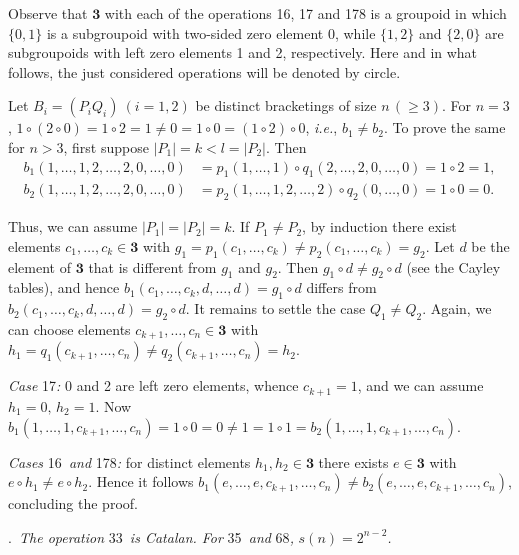 \documentclass[a4paper,reqno]{amsart}\usepackage{amssymb,latexsym}
\theoremstyle{definition}
\theoremstyle{remark}
\numberwithin{equation}{section}
\numberwithin{theorem}{section}
\begin{document}
\smallskip

Observe that $\mathbf{3}$ with each of the operations 16, 17 and 178 is a
groupoid in which $\{0,1\}$ is a subgroupoid with two-sided zero element 0,
while $\{1,2\}$ and $\{2,0\}$ are subgroupoids with left zero elements 1 and
2, respectively. Here and in what follows, the just considered operations will
be denoted by circle.

Let $B_{i}=(P_{i}Q_{i})~(i=1,2)$ be distinct bracketings of size $n\,(\geq3)
$. For $n=3$, $1\circ(2\circ0)=1\circ2=1\neq0=1\circ0=(1\circ2)\circ0$,
\textit{i.e.}, $b_{1}\neq b_{2}$. To prove the same for $n>3$, first suppose
$|P_{1}|=k<l=|P_{2}|$. Then\begin{align*}
b_{1}(1,\ldots,1,2,\ldots,2,0,\ldots,0)  &  =p_{1}(1,\ldots,1)\circ
q_{1}(2,\ldots,2,0,\ldots,0)=1\circ2=1,\\
b_{2}(1,\ldots,1,2,\ldots,2,0,\ldots,0)  &  =p_{2}(1,\ldots,1,2,\ldots,2)\circ
q_{2}(0,\ldots,0)=1\circ0=0.
\end{align*}

Thus, we can assume $|P_{1}|=|P_{2}|=k$. If $P_{1}\neq P_{2}$, by induction
there exist elements $c_{1},\ldots,c_{k}\in\mathbf{3}$ with $g_{1}=p_{1}(c_{1},\ldots,c_{k})\neq p_{2}(c_{1},\ldots,c_{k})=g_{2}$. Let $d$ be the
element of $\mathbf{3}$ that is different from $g_{1}$ and $g_{2}$. Then
$g_{1}\circ d\neq g_{2}\circ d$ (see the Cayley tables), and hence
$b_{1}(c_{1},\ldots,c_{k},d,\ldots,d)=g_{1}\circ d$ differs from $b_{2}(c_{1},\ldots,c_{k},d,\ldots,d)=g_{2}\circ d$. It remains to settle the case
$Q_{1}\neq Q_{2}$. Again, we can choose elements $c_{k+1},\ldots,c_{n}\in\mathbf{3}$ with $h_{1}=q_{1}(c_{k+1},\ldots,c_{n})\neq q_{2}(c_{k+1},\ldots,c_{n})=h_{2}$.

\noindent\textit{Case }17\textit{:} 0 and 2 are left zero elements, whence
$c_{k+1}=1$, and we can assume $h_{1}=0,\,h_{2}=1$. Now $b_{1}(1,\ldots
,1,c_{k+1},\ldots,c_{n})=1\circ0=0\neq1=1\circ1=b_{2}(1,\ldots,1,c_{k+1},\ldots,c_{n})$.

\noindent\textit{Cases }16\textit{\ and }178\textit{:} for distinct elements
$h_{1},h_{2}\in\mathbf{3}$ there exists $e\in\mathbf{3}$ with $e\circ
h_{1}\neq e\circ h_{2}$. Hence it follows $b_{1}(e,\ldots,e,c_{k+1},\ldots,c_{n})\neq b_{2}(e,\ldots,e,c_{k+1},\ldots,c_{n})$, concluding the proof.

\bigskip

.\textit{\ The operation }33\textit{\ is Catalan. For
}35\textit{\ and }68\textit{, }$s(n)=2^{n-2}$\textit{.}
\end{document}

